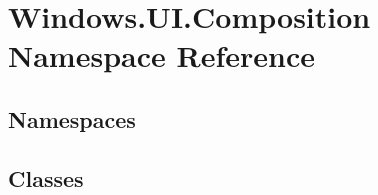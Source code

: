 \hypertarget{namespace_windows_1_1_u_i_1_1_composition}{}\section{Windows.\+U\+I.\+Composition Namespace Reference}
\label{namespace_windows_1_1_u_i_1_1_composition}
\subsection*{Namespaces}
\begin{DoxyCompactItemize}
\end{DoxyCompactItemize}
\subsection*{Classes}
